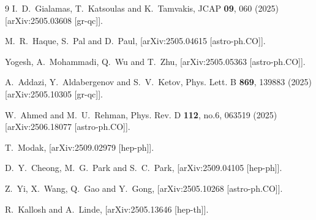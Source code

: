 \documentclass[aps,prev,twocolumn,preprintnumbers,floatfix,nofootinbib]{revtex4-1}
\begin{document}
\begin{thebibliography}{9}
I.~D.~Gialamas, T.~Katsoulas and K.~Tamvakis,
JCAP \textbf{09}, 060 (2025)
[arXiv:2505.03608 [gr-qc]].


M.~R.~Haque, S.~Pal and D.~Paul,
[arXiv:2505.04615 [astro-ph.CO]].

Yogesh, A.~Mohammadi, Q.~Wu and T.~Zhu,
[arXiv:2505.05363 [astro-ph.CO]].

A.~Addazi, Y.~Aldabergenov and S.~V.~Ketov,
Phys. Lett. B \textbf{869}, 139883 (2025)
[arXiv:2505.10305 [gr-qc]].

W.~Ahmed and M.~U.~Rehman,
Phys. Rev. D \textbf{112}, no.6, 063519 (2025)
[arXiv:2506.18077 [astro-ph.CO]].

T.~Modak,
[arXiv:2509.02979 [hep-ph]].

D.~Y.~Cheong, M.~G.~Park and S.~C.~Park,
[arXiv:2509.04105 [hep-ph]].


Z.~Yi, X.~Wang, Q.~Gao and Y.~Gong,
[arXiv:2505.10268 [astro-ph.CO]].

R.~Kallosh and A.~Linde,
[arXiv:2505.13646 [hep-th]].


\end{thebibliography}
\end{document}
